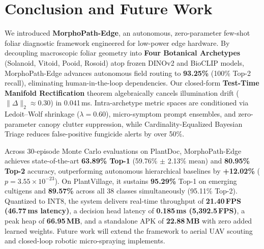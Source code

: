 \section{Conclusion and Future Work}
\label{sec:conclusion}
\balance
We introduced \textbf{MorphoPath-Edge}, an autonomous, zero-parameter few-shot foliar diagnostic framework engineered for low-power edge hardware. By decoupling macroscopic foliar geometry into \textbf{Four Botanical Archetypes} (Solanoid, Vitoid, Pooid, Rosoid) atop frozen DINOv2 and BioCLIP models, MorphoPath-Edge advances autonomous field routing to \textbf{93.25\%} (100\% Top-2 recall), eliminating human-in-the-loop dependencies. Our closed-form \textbf{Test-Time Manifold Rectification} theorem algebraically cancels illumination drift ($\|\Delta\|_2 \approx 0.30$) in 0.041\,ms. Intra-archetype metric spaces are conditioned via Ledoit--Wolf shrinkage ($\lambda=0.60$), micro-symptom prompt ensembles, and zero-parameter canopy clutter suppression, while Cardinality-Equalized Bayesian Triage reduces false-positive fungicide alerts by over 50\%.

Across 30-episode Monte Carlo evaluations on PlantDoc, MorphoPath-Edge achieves state-of-the-art \textbf{63.89\% Top-1} (59.76\% $\pm$ 2.13\% mean) and \textbf{80.95\% Top-2} accuracy, outperforming autonomous hierarchical baselines by \textbf{+12.02\%} ($p = 3.55 \times 10^{-23}$). On PlantVillage, it sustains \textbf{95.29\%} Top-1 on emerging cultigens and \textbf{89.57\%} across all 38 classes simultaneously (95.11\% Top-2). Quantized to INT8, the system delivers real-time throughput of \textbf{21.40\,FPS (46.77\,ms latency)}, a decision head latency of \textbf{0.185\,ms (5,392.5\,FPS)}, a peak heap of \textbf{66.95\,MB}, and a standalone APK of \textbf{22.88\,MB} with zero added learned weights. Future work will extend the framework to aerial UAV scouting and closed-loop robotic micro-spraying implements.